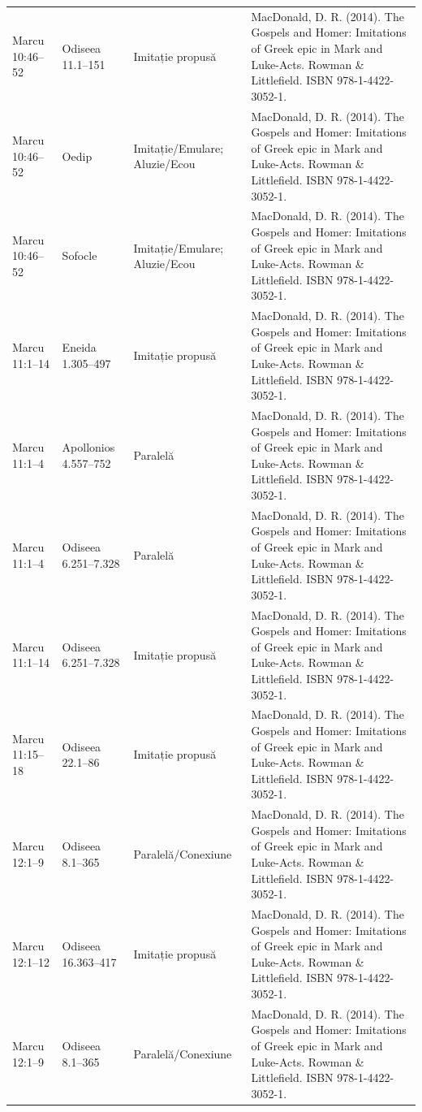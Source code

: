 \documentclass[12pt,a4paper,twoside,openany]{book}
\begin{document}
\begin{longtable}{L{1.4cm}L{1.7cm}L{3.1cm}L{8.4cm}}
Marcu 10:46–52 & Odiseea 11.1–151 & Imitație propusă & MacDonald, D. R. (2014). The Gospels and Homer: Imitations of Greek epic in Mark and Luke-Acts. Rowman \& Littlefield. ISBN 978-1-4422-3052-1. \\
Marcu 10:46–52 & Oedip & Imitație/Emulare; Aluzie/Ecou & MacDonald, D. R. (2014). The Gospels and Homer: Imitations of Greek epic in Mark and Luke-Acts. Rowman \& Littlefield. ISBN 978-1-4422-3052-1. \\
Marcu 10:46–52 & Sofocle & Imitație/Emulare; Aluzie/Ecou & MacDonald, D. R. (2014). The Gospels and Homer: Imitations of Greek epic in Mark and Luke-Acts. Rowman \& Littlefield. ISBN 978-1-4422-3052-1. \\
Marcu 11:1–14 & Eneida 1.305–497 & Imitație propusă & MacDonald, D. R. (2014). The Gospels and Homer: Imitations of Greek epic in Mark and Luke-Acts. Rowman \& Littlefield. ISBN 978-1-4422-3052-1. \\
Marcu 11:1–4 & Apollonios 4.557–752 & Paralelă & MacDonald, D. R. (2014). The Gospels and Homer: Imitations of Greek epic in Mark and Luke-Acts. Rowman \& Littlefield. ISBN 978-1-4422-3052-1. \\
Marcu 11:1–4 & Odiseea 6.251–7.328 & Paralelă & MacDonald, D. R. (2014). The Gospels and Homer: Imitations of Greek epic in Mark and Luke-Acts. Rowman \& Littlefield. ISBN 978-1-4422-3052-1. \\
Marcu 11:1–14 & Odiseea 6.251–7.328 & Imitație propusă & MacDonald, D. R. (2014). The Gospels and Homer: Imitations of Greek epic in Mark and Luke-Acts. Rowman \& Littlefield. ISBN 978-1-4422-3052-1. \\
Marcu 11:15–18 & Odiseea 22.1–86 & Imitație propusă & MacDonald, D. R. (2014). The Gospels and Homer: Imitations of Greek epic in Mark and Luke-Acts. Rowman \& Littlefield. ISBN 978-1-4422-3052-1. \\
Marcu 12:1–9 & Odiseea 8.1–365 & Paralelă/Conexiune & MacDonald, D. R. (2014). The Gospels and Homer: Imitations of Greek epic in Mark and Luke-Acts. Rowman \& Littlefield. ISBN 978-1-4422-3052-1. \\
Marcu 12:1–12 & Odiseea 16.363–417 & Imitație propusă & MacDonald, D. R. (2014). The Gospels and Homer: Imitations of Greek epic in Mark and Luke-Acts. Rowman \& Littlefield. ISBN 978-1-4422-3052-1. \\
Marcu 12:1–9 & Odiseea 8.1–365 & Paralelă/Conexiune & MacDonald, D. R. (2014). The Gospels and Homer: Imitations of Greek epic in Mark and Luke-Acts. Rowman \& Littlefield. ISBN 978-1-4422-3052-1. \\

\end{longtable}
\end{document}
